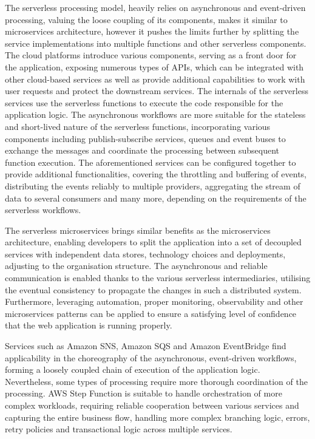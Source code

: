 The serverless processing model, heavily relies on asynchronous and event-driven processing, valuing the loose coupling of its components, makes it similar to microservices architecture, however it pushes the limits further by splitting the service implementations into multiple functions and other serverless components.
The cloud platforms introduce various components, serving as a front door for the application, exposing numerous types of APIs, which can be integrated with other cloud-based services as well as provide additional capabilities to work with user requests and protect the downstream services.
The internals of the serverless services use the serverless functions to execute the code responsible for the application logic.
The asynchronous workflows are more suitable for the stateless and short-lived nature of the serverless functions, incorporating various components including publish-subscribe services, queues and event buses to exchange the messages and coordinate the processing between subsequent function execution.
The aforementioned services can be configured together to provide additional functionalities, covering the throttling and buffering of events, distributing the events reliably to multiple providers, aggregating the stream of data to several consumers and many more, depending on the requirements of the serverless workflows.

The serverless microservices brings similar benefits as the microservices architecture, enabling developers to split the application into a set of decoupled services with independent data stores, technology choices and deployments, adjusting to the organisation structure.
The asynchronous and reliable communication is enabled thanks to the various serverless intermediaries, utilising the eventual consistency to propagate the changes in such a distributed system.
Furthermore, leveraging automation, proper monitoring, observability and other microservices patterns can be applied to ensure a satisfying level of confidence that the web application is running properly.

Services such as Amazon SNS, Amazon SQS and Amazon EventBridge find applicability in the choreography of the asynchronous, event-driven workflows, forming a loosely coupled chain of execution of the application logic.
Nevertheless, some types of processing require more thorough coordination of the processing.
AWS Step Function is suitable to handle orchestration of more complex workloads, requiring reliable cooperation between various services and capturing the entire business flow, handling more complex branching logic, errors, retry policies and transactional logic across multiple services.

